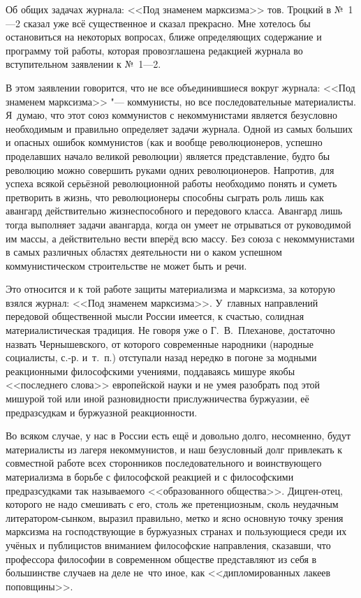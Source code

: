 Об общих задачах журнала: <<Под знаменем марксизма>> тов. Троцкий в №~1---2
сказал уже всё существенное и сказал прекрасно. Мне хотелось бы
остановиться на некоторых вопросах, ближе определяющих содержание и
программу той работы, которая провозглашена редакцией журнала во
вступительном заявлении к №~1---2.

В этом заявлении говорится, что не все объединившиеся вокруг журнала: <<Под
знаменем марксизма>> "--- коммунисты, но все последовательные материалисты.
Я~думаю, что этот союз коммунистов с некоммунистами является безусловно
необходимым и правильно определяет задачи журнала. Одной из самых больших и
опасных ошибок коммунистов (как и вообще революционеров, успешно
проделавших начало великой революции) является представление, будто бы
революцию можно совершить руками одних революционеров. Напротив, для успеха
всякой серьёзной революционной работы необходимо понять и суметь претворить
в жизнь, что революционеры способны сыграть роль лишь как авангард
действительно жизнеспособного и передового класса. Авангард лишь тогда
выполняет задачи авангарда, когда он умеет не отрываться от руководимой им
массы, а действительно вести вперёд всю массу. Без союза с некоммунистами в
самых различных областях деятельности ни о каком успешном коммунистическом
строительстве не может быть и речи.

Это относится и к той работе защиты материализма и марксизма, за которую
взялся журнал: <<Под знаменем марксизма>>. У~главных направлений передовой
общественной мысли России имеется, к счастью, солидная материалистическая
традиция. Не говоря уже о Г.~В.~Плеханове, достаточно назвать
Чернышевского, от которого современные народники (народные социалисты,
с.-р. и~т.~п.) отступали назад нередко в погоне за модными реакционными
философскими учениями, поддаваясь мишуре якобы <<последнего слова>>
европейской науки и не умея разобрать под этой мишурой той или иной
разновидности прислужничества буржуазии, её предразсудкам и буржуазной
реакционности.

Во всяком случае, у нас в России есть ещё и довольно долго, несомненно,
будут материалисты из лагеря некоммунистов, и наш безусловный долг
привлекать к совместной работе всех сторонников последовательного и
воинствующего материализма в борьбе с философской реакцией и с философскими
предразсудками так называемого <<образованного общества>>. Дицген-отец,
которого не надо смешивать с его, столь же претенциозным, сколь неудачным
литератором-сынком, выразил правильно, метко и ясно основную точку зрения
марксизма на господствующие в буржуазных странах и пользующиеся среди их
учёных и публицистов вниманием философские направления, сказавши, что
профессора философии в современном обществе представляют из себя в
большинстве случаев на деле не~что иное, как <<дипломированных лакеев
поповщины>>.

